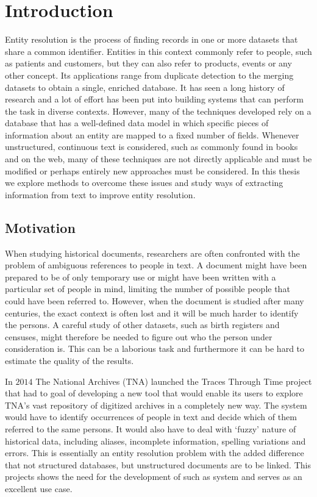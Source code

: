 \section{Introduction}
\label{sec:introduction}

Entity resolution is the process of finding records in one or more datasets that share a common identifier.
Entities in this context commonly refer to people, such as patients and customers, but they can also refer to products, events or any other concept.
Its applications range from duplicate detection to the merging datasets to obtain a single, enriched database.
It has seen a long history of research and a lot of effort has been put into building systems that can perform the task in diverse contexts.
However, many of the techniques developed rely on a database that has a well-defined data model in which specific pieces of information about an entity are mapped to a fixed number of fields.
Whenever unstructured, continuous text is considered, such as commonly found in books and on the web, many of these techniques are not directly applicable and must be modified or perhaps entirely new approaches must be considered.
In this thesis we explore methods to overcome these issues and study ways of extracting information from text to improve entity resolution.




\subsection{Motivation}
\label{sec:motivation}

When studying historical documents, researchers are often confronted with the problem of ambiguous references to people in text.
A document might have been prepared to be of only temporary use or might have been written with a particular set of people in mind, limiting the number of possible people that could have been referred to.
However, when the document is studied after many centuries, the exact context is often lost and it will be much harder to identify the persons.
A careful study of other datasets, such as birth registers and censuses, might therefore be needed to figure out who the person under consideration is.
This can be a laborious task and furthermore it can be hard to estimate the quality of the results.

In $2014$ The National Archives (TNA) launched the Traces Through Time project that had to goal of developing a new tool that would enable its users to explore TNA's vast repository of digitized archives in a completely new way.
The system would have to identify occurrences of people in text and decide which of them referred to the same persons.
It would also have to deal with `fuzzy' nature of historical data, including aliases, incomplete information, spelling variations and errors.
This is essentially an entity resolution problem with the added difference that not structured databases, but unstructured documents are to be linked.
This projects shows the need for the development of such as system and serves as an excellent use case.

